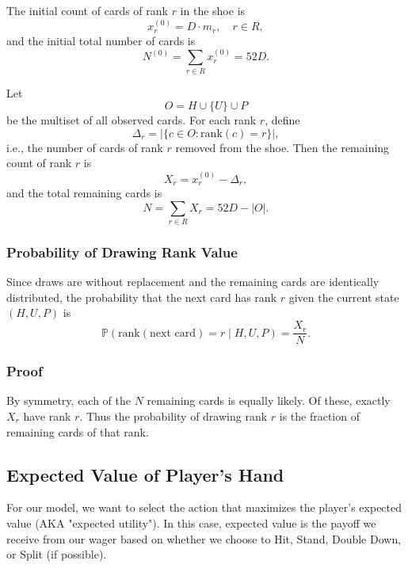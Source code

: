 \documentclass[12pt,a4paper]{cibb}
\begin{document}
The initial count of cards of rank \(r\) in the shoe is
\[
  x_r^{(0)} = D \cdot m_r, \quad r\in R,
\]
and the initial total number of cards is
\[
  N^{(0)} = \sum_{r\in R} x_r^{(0)} = 52D.
\]

Let
\[
  O = H \cup \{U\} \cup P
\]
be the multiset of all observed cards. For each rank \(r\), define
\[
  \Delta_r = |\{c \in O : \mathrm{rank}(c)=r\}|,
\]
i.e., the number of cards of rank \(r\) removed from the shoe. Then the remaining count of rank \(r\) is
\[
  X_r = x_r^{(0)} - \Delta_r,
\]
and the total remaining cards is
\[
  N = \sum_{r\in R} X_r = 52D - |O|.
\]

\subsubsection{Probability of Drawing Rank Value}

Since draws are without replacement and the remaining cards are identically distributed, the probability that the next card has rank \(r\) given the current state \((H,U,P)\) is
\[
  \mathbb{P}(\mathrm{rank}(\text{next card}) = r \mid H, U, P)
  = \frac{X_r}{N}.
\]

\subsubsection{Proof}

By symmetry, each of the $N$ remaining cards is equally likely. Of these, exactly $X_r$ have rank $r$. 
Thus the probability of drawing rank $r$ is the fraction of remaining cards of that rank. 

\subsection{{Expected Value of Player's Hand}}
\label{sec:Expected Value}
For our model, we want to select the action that maximizes the player's expected value (AKA "expected utility").
In this case, expected value is the payoff we receive from our wager based on whether we choose to Hit, Stand, Double Down, or Split (if possible). 
\end{document}
